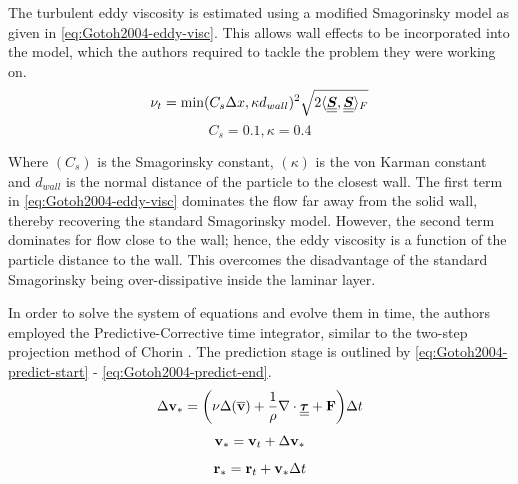 The turbulent eddy viscosity is estimated using a modified Smagorinsky model as given in \ref{eq:Gotoh2004-eddy-visc}. This allows wall effects to be incorporated into the model, which the authors required to tackle the problem they were working on.
\begin{equation}
	\nu_t = \min(C_s \Delta x, \kappa d_{wall})^2 \sqrt{2 \langle \underline{\underline{\bm{S}}}, \underline{\underline{\bm{S}}} \rangle_F}
	\label{eq:Gotoh2004-eddy-visc}
\end{equation}
\begin{equation}
	C_s=0.1, \kappa=0.4
\end{equation}

Where $(C_s)$ is the Smagorinsky constant, $(\kappa)$ is the von Karman constant and $d_{wall}$ is the normal distance of the particle to the closest wall.
The first term in \ref{eq:Gotoh2004-eddy-visc} dominates the flow far away from the solid wall, thereby recovering the standard Smagorinsky model. However, the second term dominates for flow close to the wall; hence, the eddy viscosity is a function of the particle distance to the wall. This overcomes the disadvantage of the standard Smagorinsky being over-dissipative inside the laminar layer.

In order to solve the system of equations and evolve them in time, the authors employed the Predictive-Corrective time integrator, similar to the two-step projection method of Chorin \parencite{chorin1968numerical}. The prediction stage is outlined by \ref{eq:Gotoh2004-predict-start} - \ref{eq:Gotoh2004-predict-end}. 
\begin{equation}
	\Delta \mathbf{v}_* = \bigg( \nu \Delta ( \mathbf{\overline{v}} ) + \frac{1}{\rho}\nabla\cdot\underline{\underline{\bm{\tau}}} + \mathbf{F} \bigg) \Delta t
	\label{eq:Gotoh2004-predict-start}
\end{equation}
\begin{equation}
	\mathbf{v}_* = \mathbf{v}_t + \Delta \mathbf{v}_*
\end{equation}
\begin{equation}
	\mathbf{r}_* = \mathbf{r}_t + \mathbf{v}_* \Delta t
	\label{eq:Gotoh2004-predict-end}
\end{equation}


